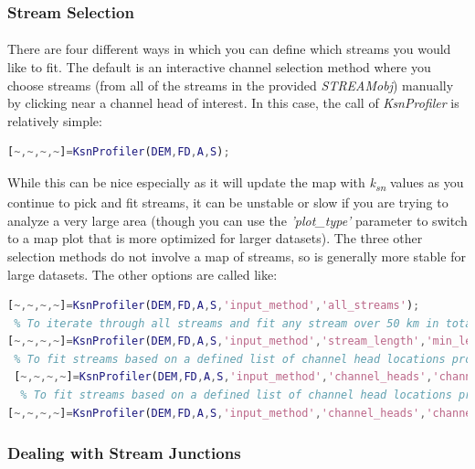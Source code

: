 \subsubsection{Stream Selection}
\paragraph{}There are four different ways in which you can define which streams you would like to fit. The default is an interactive channel selection method where you choose streams (from all of the streams in the provided \textit{STREAMobj}) manually by clicking near a channel head of interest. In this case, the call of \textit{KsnProfiler} is relatively simple:

\begin{lstlisting}[language=Matlab]
[~,~,~,~]=KsnProfiler(DEM,FD,A,S);
\end{lstlisting}

\noindent
 While this can be nice especially as it will update the map with \textit{k\textsubscript{sn}} values as you continue to pick and fit streams, it can be unstable or slow if you are trying to analyze a very large area (though you can use the \textit{'plot\_type'} parameter to switch to a map plot that is more optimized for larger datasets). The three other selection methods do not involve a map of streams, so is generally more stable for large datasets. The other options are called like:
 
 \begin{lstlisting}[language=Matlab]
 % To iterate through all streams in the provided STREAMobj:
[~,~,~,~]=KsnProfiler(DEM,FD,A,S,'input_method','all_streams');
 % To iterate through all streams and fit any stream over 50 km in total length:
[~,~,~,~]=KsnProfiler(DEM,FD,A,S,'input_method','stream_length','min_length_to_extract',50000);
 % To fit streams based on a defined list of channel head locations provided as an array of channel head locations (chl in the example below):
 [~,~,~,~]=KsnProfiler(DEM,FD,A,S,'input_method','channel_heads','channel_head_list',chl);
  % To fit streams based on a defined list of channel head locations provided as an array of channel head locations from a point shapefile of channel heads:
[~,~,~,~]=KsnProfiler(DEM,FD,A,S,'input_method','channel_heads','channel_head_list','channel_heads.shp');
 \end{lstlisting}
 
\subsubsection{Dealing with Stream Junctions}
